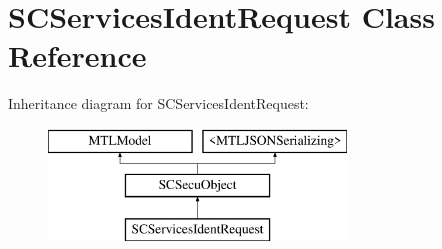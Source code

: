 \hypertarget{interface_s_c_services_ident_request}{}\section{S\+C\+Services\+Ident\+Request Class Reference}
\label{interface_s_c_services_ident_request}
Inheritance diagram for S\+C\+Services\+Ident\+Request\+:\begin{figure}[H]
\begin{center}
\leavevmode
\includegraphics[height=3.000000cm]{interface_s_c_services_ident_request}
\end{center}
\end{figure}
